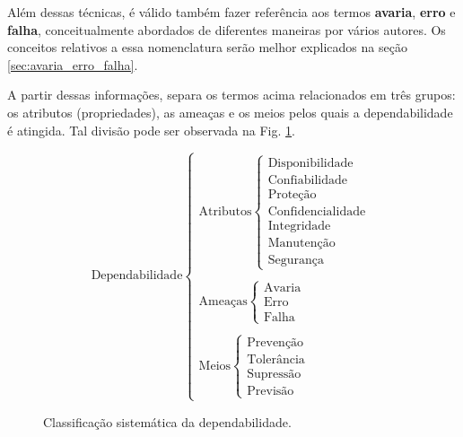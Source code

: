 Além dessas técnicas, é válido também fazer referência aos termos {\bf avaria},
{\bf erro} e {\bf falha}, conceitualmente abordados de diferentes maneiras por
vários autores. Os conceitos relativos a essa nomenclatura serão melhor
explicados na seção \ref{sec:avaria_erro_falha}.

A partir dessas informações,  separa os termos acima
relacionados em três grupos: os atributos (propriedades), as ameaças e os meios
pelos quais a dependabilidade é atingida. Tal divisão pode ser observada na Fig.
\ref{fig:div_avizienis}.

\begin{figure}[htb]
\centering
\footnotesize
\[
\text{Dependabilidade}
\left\{
\begin{array}{l}
\text{Atributos}
    \left\{
    \begin{array}{l}
        \text{Disponibilidade}\\
        \text{Confiabilidade}\\
        \text{Proteção}\\
        \text{Confidencialidade}\\
        \text{Integridade}\\
        \text{Manutenção}\\
        \text{Segurança}
    \end{array}
    \right.
\\
\\
\text{Ameaças}
    \left\{
    \begin{array}{l}
        \text{Avaria}\\
        \text{Erro}\\
        \text{Falha}
    \end{array}
    \right.
\\
\\
\text{Meios}
    \left\{
    \begin{array}{l}
        \text{Prevenção}\\
        \text{Tolerância}\\
        \text{Supressão}\\
        \text{Previsão}
    \end{array}
    \right.
\end{array}
\right.
\]
\caption{Classificação sistemática da dependabilidade.}
\label{fig:div_avizienis}
\end{figure}

